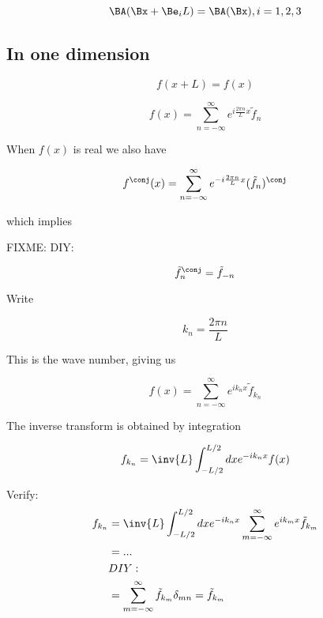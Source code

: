 \begin{equation}\label{eqn:relativisticElectrodynamicsL15:n}
\BA(\Bx + \Be_i L) = \BA(\Bx), i = 1,2,3
\end{equation}

\subsection{In one dimension}

\begin{equation}\label{eqn:relativisticElectrodynamicsL15:n}
f(x + L) = f(x)
\end{equation}

\begin{equation}\label{eqn:relativisticElectrodynamicsL15:n}
f(x) = \sum_{n=-\infty}^\infty e^{i \frac{2 \pi n}{L} x} \tilde{f}_n
\end{equation}

When $f(x)$ is real we also have

\begin{equation}\label{eqn:relativisticElectrodynamicsL15:n}
f^\conj(x) = \sum_{n = -\infty}^\infty e^{-i \frac{2 \pi n}{L} x} (\tilde{f}_n)^\conj
\end{equation}

which implies

FIXME: DIY: 

\begin{equation}\label{eqn:relativisticElectrodynamicsL15:n}
{\tilde{f}^\conj}_{n} = \tilde{f}_{-n}
\end{equation}

Write 

\begin{equation}\label{eqn:relativisticElectrodynamicsL15:n}
k_n = \frac{2 \pi n}{L}
\end{equation}

This is the wave number, giving us

\begin{equation}\label{eqn:relativisticElectrodynamicsL15:n}
f(x) = \sum_{n=-\infty}^\infty e^{i k_n x} \tilde{f}_{k_n}
\end{equation}

The inverse transform is obtained by integration

\begin{equation}\label{eqn:relativisticElectrodynamicsL15:n}
f_{k_n} = \inv{L} \int_{-L/2}^{L/2} dx e^{-i k_n x} f(x)
\end{equation}

Verify: 
\begin{align*}
f_{k_n} 
&= \inv{L} \int_{-L/2}^{L/2} dx e^{-i k_n x} \sum_{m=-\infty}^\infty e^{i k_m x} \tilde{f}_{k_m} \\
&= ...  \\
&DIY: \\
&= \sum_{m = -\infty}^\infty \tilde{f}_{k_m} \delta_{mn} = \tilde{f}_{k_m}
\end{align*}

